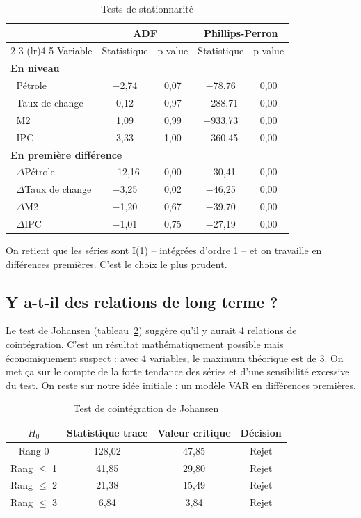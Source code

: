 \documentclass[12pt,a4paper]{article}
\begin{document}
\begin{table}[H]
  \centering
  \caption{Tests de stationnarité}
  \label{tab:stationnarite}
  \begin{tabular}{lcccc}
    \toprule
    & \multicolumn{2}{c}{ADF} & \multicolumn{2}{c}{Phillips-Perron} \\
    \cmidrule(lr){2-3} \cmidrule(lr){4-5}
    Variable & Statistique & p-value & Statistique & p-value \\
    \midrule
    \multicolumn{5}{l}{\textbf{En niveau}} \\
    $\;$ Pétrole & $-$2,74 & 0,07 & $-$78,76 & 0,00 \\
    $\;$ Taux de change & 0,12 & 0,97 & $-$288,71 & 0,00 \\
    $\;$ M2 & 1,09 & 0,99 & $-$933,73 & 0,00 \\
    $\;$ IPC & 3,33 & 1,00 & $-$360,45 & 0,00 \\
    \midrule
    \multicolumn{5}{l}{\textbf{En première différence}} \\
    $\;$ $\Delta$Pétrole & $-$12,16 & 0,00 & $-$30,41 & 0,00 \\
    $\;$ $\Delta$Taux de change & $-$3,25 & 0,02 & $-$46,25 & 0,00 \\
    $\;$ $\Delta$M2 & $-$1,20 & 0,67 & $-$39,70 & 0,00 \\
    $\;$ $\Delta$IPC & $-$1,01 & 0,75 & $-$27,19 & 0,00 \\
    \bottomrule
  \end{tabular}
\end{table}

On retient que les séries sont I(1) -- intégrées d'ordre 1 -- et on travaille en différences premières. C'est le choix le plus prudent.

\subsection{Y a-t-il des relations de long terme ?}

Le test de Johansen (tableau~\ref{tab:cointegration}) suggère qu'il y aurait 4 relations de cointégration. C'est un résultat mathématiquement possible mais économiquement suspect : avec 4 variables, le maximum théorique est de 3. On met ça sur le compte de la forte tendance des séries et d'une sensibilité excessive du test. On reste sur notre idée initiale : un modèle VAR en différences premières.

\begin{table}[H]
  \centering
  \caption{Test de cointégration de Johansen}
  \label{tab:cointegration}
  \begin{tabular}{cccc}
    \toprule
    $H_0$ & Statistique trace & Valeur critique & Décision \\
    \midrule
    Rang 0 & 128,02 & 47,85 & Rejet \\
    Rang $\leq$ 1 & 41,85 & 29,80 & Rejet \\
    Rang $\leq$ 2 & 21,38 & 15,49 & Rejet \\
    Rang $\leq$ 3 & 6,84 & 3,84 & Rejet \\
    \bottomrule
  \end{tabular}
\end{table}
\end{document}
